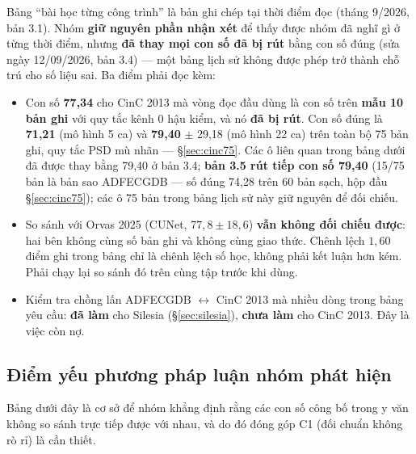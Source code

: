 \begin{canhbao}[title={Bảng dưới đây giữ nguyên \textit{nhận xét} của vòng đọc đầu, nhưng số đã rút thì đã sửa}]
Bảng ``bài học từng công trình'' là bản ghi chép tại thời điểm đọc (tháng 9/2026, bản 3.1). Nhóm
\textbf{giữ nguyên phần nhận xét} để thấy được nhóm đã nghĩ gì ở từng thời điểm, nhưng \textbf{đã thay
mọi con số đã bị rút} bằng con số đúng (sửa ngày 12/09/2026, bản 3.4) --- một bảng lịch sử không được
phép trở thành chỗ trú cho số liệu sai. Ba điểm phải đọc kèm:
\begin{itemize}[leftmargin=1.5em,itemsep=2pt]
\item Con số \textbf{77,34} cho CinC 2013 mà vòng đọc đầu dùng là con số trên \textbf{mẫu 10 bản ghi}
với quy tắc kênh 0 hậu kiểm, và nó \textbf{đã bị rút}. Con số đúng là \textbf{71,21} (mô hình 5 ca) và
\textbf{79,40} $\pm$ 29,18 (mô hình 22 ca) trên toàn bộ 75 bản ghi, quy tắc PSD mù nhãn ---
\S\ref{sec:cinc75}. Các ô liên quan trong bảng dưới đã được thay bằng 79,40 ở bản 3.4; \textbf{bản 3.5 rút
tiếp con số 79,40} (15/75 bản là bản sao ADFECGDB --- số đúng 74,28 trên 60 bản sạch, hộp đầu
\S\ref{sec:cinc75}); các ô 75 bản trong bảng lịch sử này giữ nguyên để đối chiếu.
\item So sánh với Orvas 2025 (CUNet, $77{,}8 \pm 18{,}6$) \textbf{vẫn không đối chiếu được}: hai bên
không cùng số bản ghi và không cùng giao thức. Chênh lệch $1{,}60$ điểm ghi trong bảng chỉ là chênh
lệch số học, không phải kết luận hơn kém. Phải chạy lại so sánh đó trên cùng tập trước khi dùng.
\item Kiểm tra chồng lấn ADFECGDB $\leftrightarrow$ CinC 2013 mà nhiều dòng trong bảng yêu cầu:
\textbf{đã làm} cho Silesia (\S\ref{sec:silesia}), \textbf{chưa làm} cho CinC 2013. Đây là việc còn nợ.
\end{itemize}
\end{canhbao}



\subsection{Điểm yếu phương pháp luận nhóm phát hiện}

Bảng dưới đây là cơ sở để nhóm khẳng định rằng các con số công bố trong y văn không so sánh trực tiếp
được với nhau, và do đó đóng góp C1 (đối chuẩn không rò rỉ) là cần thiết.



\clearpage

